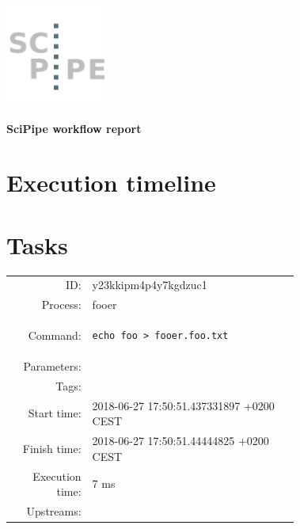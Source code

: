 \documentclass[11pt,oneside,openright]{memoir}
\begin{document}
\pagestyle{plain}
\noindent
\begin{minipage}{\textwidth}
    \vspace{-8em}\hspace{-8em}
    \includegraphics[width=9em]{images/scipipe_logo_bluegrey.pdf}
\end{minipage}

\noindent 
{\huge\textbf{SciPipe workflow report}}
\section*{Execution timeline}

%
%
\section*{Tasks}

    \begin{tcolorbox}[ title=fooer, 
                       colbacktitle=color1, 
                       colback=color1!50!white,
                       coltitle=black ]
        \small
        \begin{tabular}{rp{0.72\linewidth}}
ID: & y23kkipm4p4y7kgdzuc1 \\
Process: & fooer \\
Command: & \begin{lstlisting}
echo foo > fooer.foo.txt
\end{lstlisting} \\
Parameters:& \\
Tags: & \\
Start time:  & 2018-06-27 17:50:51.437331897 +0200 CEST \\
Finish time: & 2018-06-27 17:50:51.44444825 +0200 CEST \\
Execution time: & 7 ms \\
Upstreams: & \\
        \end{tabular}
    \end{tcolorbox}
\end{document}

